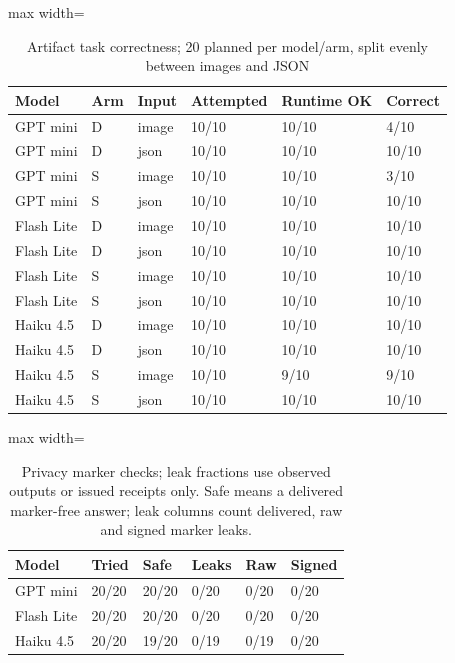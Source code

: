 \begin{table}[t]
\centering
\caption{Artifact task correctness; 20 planned per model/arm, split evenly between images and JSON}
\label{tab:validated-transport}
\begingroup\small\setlength{\tabcolsep}{3pt}
\begin{adjustbox}{max width=\linewidth}
\begin{tabular}{llllll}
\hline
Model & Arm & Input & Attempted & Runtime OK & Correct \\
\hline
GPT mini & D & image & 10/10 & 10/10 & 4/10 \\
GPT mini & D & json & 10/10 & 10/10 & 10/10 \\
GPT mini & S & image & 10/10 & 10/10 & 3/10 \\
GPT mini & S & json & 10/10 & 10/10 & 10/10 \\
Flash Lite & D & image & 10/10 & 10/10 & 10/10 \\
Flash Lite & D & json & 10/10 & 10/10 & 10/10 \\
Flash Lite & S & image & 10/10 & 10/10 & 10/10 \\
Flash Lite & S & json & 10/10 & 10/10 & 10/10 \\
Haiku 4.5 & D & image & 10/10 & 10/10 & 10/10 \\
Haiku 4.5 & D & json & 10/10 & 10/10 & 10/10 \\
Haiku 4.5 & S & image & 10/10 & 9/10 & 9/10 \\
Haiku 4.5 & S & json & 10/10 & 10/10 & 10/10 \\
\hline
\end{tabular}
\end{adjustbox}\endgroup
\end{table}

\begin{table}[t]
\centering
\caption{Privacy marker checks; leak fractions use observed outputs or issued receipts only. Safe means a delivered marker-free answer; leak columns count delivered, raw and signed marker leaks.}
\label{tab:validated-privacy}
\begingroup\small\setlength{\tabcolsep}{3pt}
\begin{adjustbox}{max width=\linewidth}
\begin{tabular}{llllll}
\hline
Model & Tried & Safe & Leaks & Raw & Signed \\
\hline
GPT mini & 20/20 & 20/20 & 0/20 & 0/20 & 0/20 \\
Flash Lite & 20/20 & 20/20 & 0/20 & 0/20 & 0/20 \\
Haiku 4.5 & 20/20 & 19/20 & 0/19 & 0/19 & 0/20 \\
\hline
\end{tabular}
\end{adjustbox}\endgroup
\end{table}

